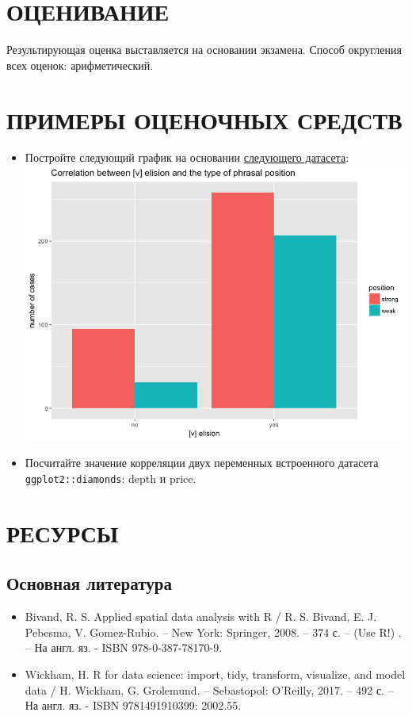 \documentclass[a4paper]{article}
\begin{document}
\section{ОЦЕНИВАНИЕ}
Результирующая оценка выставляется на основании экзамена. Способ округления всех оценок: арифметический.
\section{ПРИМЕРЫ ОЦЕНОЧНЫХ СРЕДСТВ}
\begin{itemize}
\item Постройте следующий график на основании \href{https://tinyurl.com/y8oqsczd}{следующего датасета}:\\
\includegraphics[width=0.5\linewidth]{volition.png}
\item Посчитайте значение корреляции двух переменных встроенного датасета \texttt{ggplot2::diamonds}: depth и price.
\end{itemize}
\section{РЕСУРСЫ}
\subsection{Основная литература}
\begin{itemize}
\item   Bivand, R. S. Applied spatial data analysis with R / R. S. Bivand, E. J. Pebesma, V. Gomez-Rubio. – New York: Springer, 2008. – 374 с. – (Use R!) . – На англ. яз. - ISBN 978-0-387-78170-9. 
\item   Wickham, H.  R for data science: import, tidy, transform, visualize, and model data / H. Wickham, G. Grolemund. – Sebastopol: O'Reilly, 2017. – 492 с. – На англ. яз. - ISBN 9781491910399: 2002.55. 
\end{itemize} 
\end{document}
